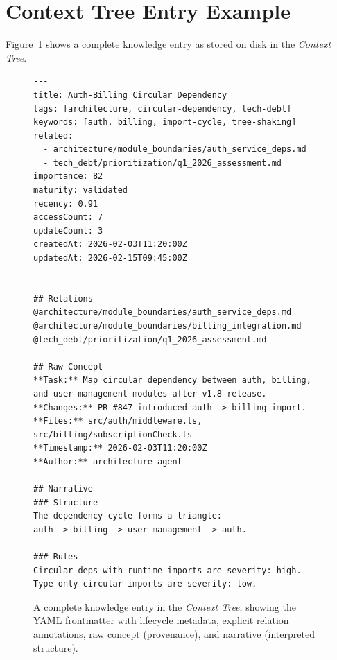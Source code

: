 \documentclass[11pt]{article}
\newcommand{\contexttree}{\textit{Context Tree}}
\begin{document}
\section{Context Tree Entry Example}
\label{app:entry-example}

Figure~\ref{fig:entry-example} shows a complete knowledge entry
as stored on disk in the \contexttree{}.

\begin{figure}[h]
\begin{tcolorbox}[
  colback=backcolor,
  colframe=codegray!50,
  title={\small\texttt{.brv/context-tree/architecture/module\_boundaries/auth\_billing\_cycle.md}},
  fonttitle=\small\ttfamily,
]
{\small
\begin{verbatim}
---
title: Auth-Billing Circular Dependency
tags: [architecture, circular-dependency, tech-debt]
keywords: [auth, billing, import-cycle, tree-shaking]
related:
  - architecture/module_boundaries/auth_service_deps.md
  - tech_debt/prioritization/q1_2026_assessment.md
importance: 82
maturity: validated
recency: 0.91
accessCount: 7
updateCount: 3
createdAt: 2026-02-03T11:20:00Z
updatedAt: 2026-02-15T09:45:00Z
---

## Relations
@architecture/module_boundaries/auth_service_deps.md
@architecture/module_boundaries/billing_integration.md
@tech_debt/prioritization/q1_2026_assessment.md

## Raw Concept
**Task:** Map circular dependency between auth, billing,
and user-management modules after v1.8 release.
**Changes:** PR #847 introduced auth -> billing import.
**Files:** src/auth/middleware.ts, src/billing/subscriptionCheck.ts
**Timestamp:** 2026-02-03T11:20:00Z
**Author:** architecture-agent

## Narrative
### Structure
The dependency cycle forms a triangle:
auth -> billing -> user-management -> auth.

### Rules
Circular deps with runtime imports are severity: high.
Type-only circular imports are severity: low.
\end{verbatim}
}
\end{tcolorbox}
\caption{A complete knowledge entry in the \contexttree{},
  showing the YAML frontmatter with lifecycle metadata,
  explicit relation annotations, raw concept (provenance),
  and narrative (interpreted structure).}
\label{fig:entry-example}
\end{figure}
\end{document}

